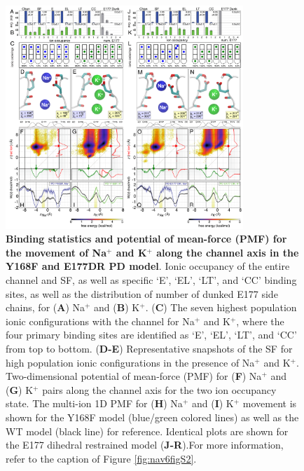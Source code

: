 \begin{refsection}
\begin{figure}[!ptb]
\centering
\includegraphics[width=0.8\textwidth]{nav6/Nav6FigS6}
\caption[Binding statistics and potential of mean-force (PMF) for the movement of Na$^+$ and K$^+$ along the channel axis in the Y168F and E177DR PD model]{ \textbf{Binding statistics and potential of mean-force (PMF) for the movement of Na$^+$ and K$^+$ along the channel axis in the Y168F and E177DR PD model}. Ionic occupancy of the entire channel and SF, as well as specific `E', `EL', `LT', and `CC' binding sites, as well as the distribution of number of dunked E177 side chains, for (\textbf{A}) Na$^+$ and (\textbf{B}) K$^+$. (\textbf{C}) The seven highest population ionic configurations with the channel for Na$^+$ and K$^+$, where the four primary binding sites are identified as `E', `EL', `LT', and `CC' from top to bottom. (\textbf{D-E}) Representative snapshots of the SF for high population ionic configurations in the presence of Na$^+$ and K$^+$. Two-dimensional potential of mean-force (PMF) for (\textbf{F}) Na$^+$ and (\textbf{G}) K$^+$ pairs along the channel axis for the two ion occupancy state. The multi-ion 1D PMF for (\textbf{H}) Na$^+$ and (\textbf{I}) K$^+$ movement is shown for the Y168F model (blue/green colored lines) as well as the WT model (black line) for reference. Identical plots are shown for the E177 dihedral restrained model (\textbf{J-R}).For more information, refer to the caption of Figure \ref{fig:nav6figS2}.}
\label{fig:nav6figS6}
\end{figure}


\end{refsection}
